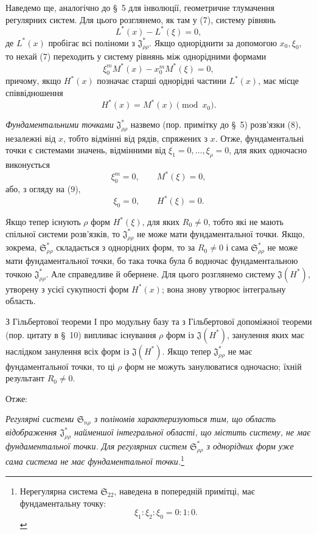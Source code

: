 \documentclass[11pt]{article}
\providecommand{\Ssys}{\mathfrak{S}}
\providecommand{\Jdom}{\mathfrak{J}}
\begin{document}
Наведемо ще, аналогічно до \S\ 5 для інволюції, геометричне тлумачення регулярних систем. Для цього розглянемо, як там у (7), систему рівнянь
\begin{equation}
  L^*(x)-L^*(\xi)=0,
\tag{7}
\end{equation}
де $L^*(x)$ пробігає всі поліноми з $\Jdom^*_{\rho\rho}$. Якщо одноріднити за допомогою $x_0,\xi_0$, то нехай (7) переходить у систему рівнянь між однорідними формами
\begin{equation}
  \xi_0^{m}M^*(x)-x_0^{m}M^*(\xi)=0,
\tag{8}
\end{equation}
причому, якщо $H^*(x)$ позначає старші однорідні частини $L^*(x)$, має місце співвідношення
\begin{equation}
  H^*(x)=M^*(x)\pmod{x_0}.
\tag{9}
\end{equation}

\emph{Фундаментальними точками} $\Jdom^*_{\rho\rho}$ назвемо (пор. примітку до \S\ 5) розв'язки (8), незалежні від $x$, тобто відмінні від рядів, спряжених з $x$. Отже, фундаментальні точки є системами значень, відмінними від $\xi_1=0,\ldots,\xi_\rho=0$, для яких одночасно виконується
\[
  \xi_0^m=0,\qquad M^*(\xi)=0,
\]
або, з огляду на (9),
\[
  \xi_0=0,
  \qquad H^*(\xi)=0.
\]

Якщо тепер існують $\rho$ форм $H^*(\xi)$, для яких $R_0\ne0$, тобто які не мають спільної системи розв'язків, то $\Jdom^*_{\rho\rho}$ не може мати фундаментальної точки. Якщо, зокрема, $\Ssys^*_{\rho\rho}$ складається з однорідних форм, то за $R_0\ne0$ і сама $\Ssys^*_{\rho\rho}$ не може мати фундаментальної точки, бо така точка була б водночас фундаментальною точкою $\Jdom^*_{\rho\rho}$. Але справедливе й обернене. Для цього розглянемо систему $\Jdom(H^*)$, утворену з усієї сукупності форм $H^*(x)$; вона знову утворює інтегральну область.

З Гільбертової теореми I про модульну базу та з Гільбертової допоміжної теореми (пор. цитату в \S\ 10) випливає існування $\rho$ форм із $\Jdom(H^*)$, занулення яких має наслідком занулення всіх форм із $\Jdom(H^*)$. Якщо тепер $\Jdom^*_{\rho\rho}$ не має фундаментальної точки, то ці $\rho$ форм не можуть занулюватися одночасно; їхній результант $R_0\ne0$.

Отже:

\emph{Регулярні системи $\Ssys_{n\rho}$ з поліномів характеризуються тим, що область відображення $\Jdom^*_{\rho\rho}$ найменшої інтегральної області, що містить систему, не має фундаментальної точки. Для регулярних систем $\Ssys^*_{\rho\rho}$ з однорідних форм уже сама система не має фундаментальної точки.}\footnote{Нерегулярна система $\Ssys_{22}$, наведена в попередній примітці, має фундаментальну точку:
\[
  \xi_1:\xi_2:\xi_0=0:1:0.
\]}
\end{document}
